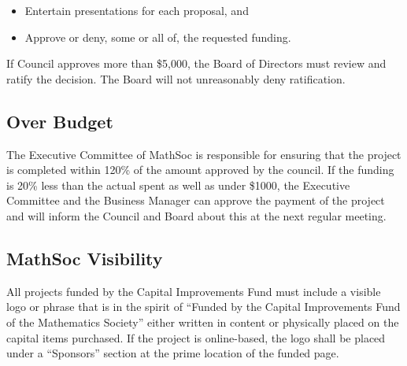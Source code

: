 \begin{itemize}
\item Entertain presentations for each proposal, and
\item Approve or deny, some or all of, the requested funding.
\end{itemize}
If Council approves more than \$5,000, the Board of Directors must review and ratify 
the decision. The Board will not unreasonably deny ratification.

\subsection{Over Budget}
The Executive Committee of MathSoc is responsible for ensuring that the project is 
completed within 120\% of the amount approved by the council. If the funding is 20\% 
less than the actual spent as well as under \$1000, the Executive Committee and the 
Business Manager can approve the payment of the project and will inform the Council 
and Board about this at the next regular meeting. 

\subsection{MathSoc Visibility}
All projects funded by the Capital Improvements Fund must include a visible logo or phrase that is in the spirit
of ``Funded by the Capital Improvements Fund of the Mathematics Society'' either written in 
content or physically placed on the capital items purchased. If the project is 
online-based, the logo shall be placed under a ``Sponsors'' section at the prime location 
of the funded page. 
